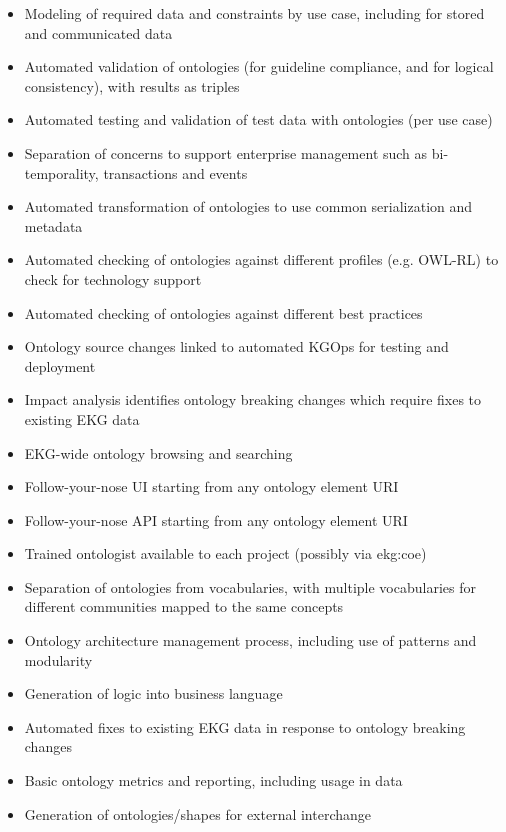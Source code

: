 \begin{itemize}
    \item Modeling of required data and constraints by use case, including for stored and communicated data
    \item Automated validation of ontologies (for guideline compliance, and for logical consistency),
          with results as triples
    \item Automated testing and validation of test data with ontologies (per use case)
    \item Separation of concerns to support enterprise management such as
          bi-temporality, transactions and events
    \item Automated transformation of ontologies to use common serialization and metadata
    \item Automated checking of ontologies against different profiles (e.g. OWL-RL)
          to check for technology support
    \item Automated checking of ontologies against different best practices
    \item Ontology source changes linked to automated KGOps for testing and deployment
    \item Impact analysis identifies ontology breaking changes which require fixes to existing EKG data
    \item EKG-wide ontology browsing and searching
    \item Follow-your-nose UI starting from any ontology element URI
    \item Follow-your-nose API starting from any ontology element URI
    \item Trained ontologist available to each project (possibly via \gls{ekg:coe})
\end{itemize}

\ekgmmscoringlevelFour

\begin{itemize}
    \item Separation of ontologies from vocabularies, with multiple vocabularies for different communities
          mapped to the same concepts
    \item Ontology architecture management process, including use of patterns and modularity
    \item Generation of logic into business language
    \item Automated fixes to existing EKG data in response to ontology breaking changes
    \item Basic ontology metrics and reporting, including usage in data
    \item Generation of ontologies/shapes for external interchange
\end{itemize}

